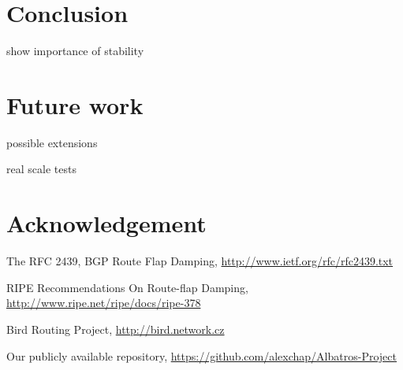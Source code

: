 \documentclass[a4paper,english]{IEEEtran}
\begin{document}
\section{Conclusion}

show importance of stability


\section{Future work}

possible extensions

real scale tests


\section{Acknowledgement}
\begin{thebibliography}{4}
The RFC 2439, BGP Route Flap Damping, \href{http://www.ietf.org/rfc/rfc2439.txt}{http://www.ietf.org/rfc/rfc2439.txt}

 RIPE Recommendations On Route-flap
Damping, \href{http://www.ripe.net/ripe/docs/ripe-378}{http://www.ripe.net/ripe/docs/ripe-378}

Bird Routing Project, \href{http://bird.network.cz}{http://bird.network.cz}

Our publicly available repository, \href{https://github.com/alexchap/Albatros-Project}{https://github.com/alexchap/Albatros-Project}
\end{thebibliography}
\end{document}
